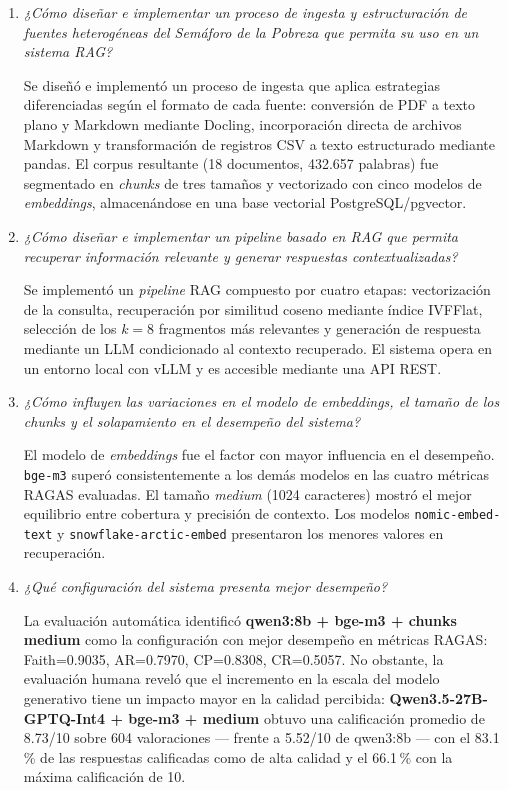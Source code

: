 \begin{enumerate}

\item \textit{¿Cómo diseñar e implementar un proceso de ingesta y estructuración de fuentes heterogéneas del Semáforo de la Pobreza que permita su uso en un sistema RAG?}

Se diseñó e implementó un proceso de ingesta que aplica estrategias diferenciadas según el formato de cada fuente: conversión de PDF a texto plano y Markdown mediante Docling, incorporación directa de archivos Markdown y transformación de registros CSV a texto estructurado mediante pandas. El corpus resultante (18 documentos, 432.657 palabras) fue segmentado en \textit{chunks} de tres tamaños y vectorizado con cinco modelos de \textit{embeddings}, almacenándose en una base vectorial PostgreSQL/pgvector.

\item \textit{¿Cómo diseñar e implementar un pipeline basado en RAG que permita recuperar información relevante y generar respuestas contextualizadas?}

Se implementó un \textit{pipeline} RAG compuesto por cuatro etapas: vectorización de la consulta, recuperación por similitud coseno mediante índice IVFFlat, selección de los $k=8$ fragmentos más relevantes y generación de respuesta mediante un LLM condicionado al contexto recuperado. El sistema opera en un entorno local con vLLM y es accesible mediante una API REST.

\item \textit{¿Cómo influyen las variaciones en el modelo de embeddings, el tamaño de los chunks y el solapamiento en el desempeño del sistema?}

El modelo de \textit{embeddings} fue el factor con mayor influencia en el desempeño. \texttt{bge-m3} superó consistentemente a los demás modelos en las cuatro métricas RAGAS evaluadas. El tamaño \textit{medium} (1024 caracteres) mostró el mejor equilibrio entre cobertura y precisión de contexto. Los modelos \texttt{nomic-embed-text} y \texttt{snowflake-arctic-embed} presentaron los menores valores en recuperación.

\item \textit{¿Qué configuración del sistema presenta mejor desempeño?}

La evaluación automática identificó \textbf{qwen3:8b + bge-m3 + chunks medium} como la configuración con mejor desempeño en métricas RAGAS: Faith=0.9035, AR=0.7970, CP=0.8308, CR=0.5057. No obstante, la evaluación humana reveló que el incremento en la escala del modelo generativo tiene un impacto mayor en la calidad percibida: \textbf{Qwen3.5-27B-GPTQ-Int4 + bge-m3 + medium} obtuvo una calificación promedio de 8.73/10 sobre 604 valoraciones — frente a 5.52/10 de qwen3:8b — con el 83.1\,\% de las respuestas calificadas como de alta calidad y el 66.1\,\% con la máxima calificación de 10.


\end{enumerate}
